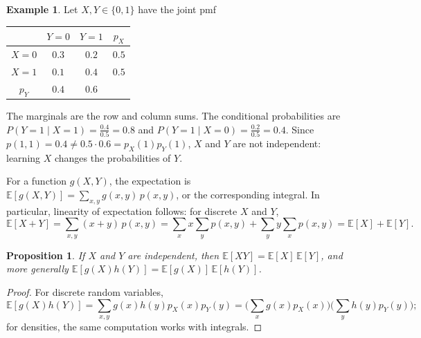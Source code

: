\documentclass[11pt]{article}
\newcommand{\E}{\mathbb{E}}
\theoremstyle{definition}
\newtheorem{example}[definition]{Example}
\theoremstyle{plain}
\newtheorem{proposition}[definition]{Proposition}
\theoremstyle{remark}
\begin{document}
\begin{example}\label{ex:joint-table}
    Let $X, Y \in \{0, 1\}$ have the joint pmf
    \begin{center}
        \renewcommand{\arraystretch}{1.2}
        \begin{tabular}{c|cc|c}
            & $Y = 0$ & $Y = 1$ & $p_X$ \\
            \hline
            $X = 0$ & $0.3$ & $0.2$ & $0.5$ \\
            $X = 1$ & $0.1$ & $0.4$ & $0.5$ \\
            \hline
            $p_Y$ & $0.4$ & $0.6$ &
        \end{tabular}
    \end{center}
    The marginals are the row and column sums. The conditional probabilities are $P(Y = 1 \mid X = 1) = \frac{0.4}{0.5} = 0.8$ and $P(Y = 1 \mid X = 0) = \frac{0.2}{0.5} = 0.4$. Since $p(1, 1) = 0.4 \neq 0.5 \cdot 0.6 = p_X(1)p_Y(1)$, $X$ and $Y$ are not independent: learning $X$ changes the probabilities of $Y$.
\end{example}

For a function $g(X, Y)$, the expectation is $\E[g(X, Y)] = \sum_{x, y} g(x, y)\,p(x, y)$, or the corresponding integral. In particular, linearity of expectation follows: for discrete $X$ and $Y$,
\[\E[X + Y] = \sum_{x, y}(x + y)\,p(x, y) = \sum_x x\sum_y p(x, y) + \sum_y y\sum_x p(x, y) = \E[X] + \E[Y].\]

\begin{proposition}\label{prop:independent-product}
    If $X$ and $Y$ are independent, then $\E[XY] = \E[X]\,\E[Y]$, and more generally $\E[g(X)h(Y)] = \E[g(X)]\,\E[h(Y)]$.
\end{proposition}

\begin{proof}
    For discrete random variables,
    \[\E[g(X)h(Y)] = \sum_{x, y} g(x)h(y)p_X(x)p_Y(y) = \Big(\sum_x g(x)p_X(x)\Big)\Big(\sum_y h(y)p_Y(y)\Big);\]
    for densities, the same computation works with integrals.
\end{proof}
\end{document}
